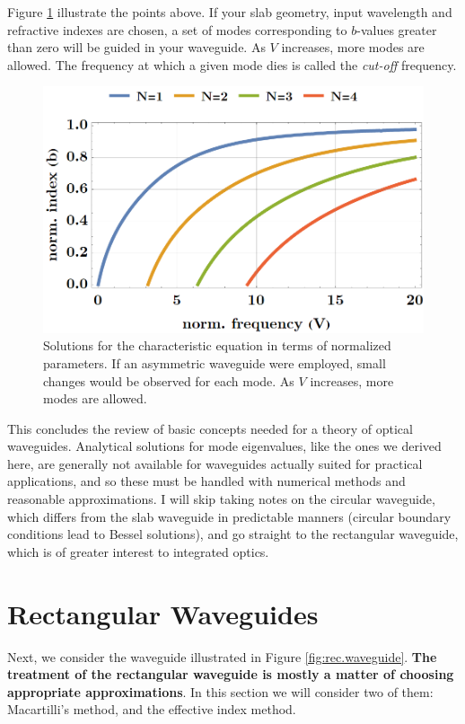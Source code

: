 Figure \ref{fig:characteric.equation} illustrate the points above. If your slab geometry, input wavelength and refractive indexes are chosen, a set of modes corresponding to $b$-values greater than zero will be guided in your waveguide. As $V$ increases, more modes are allowed. The frequency at which a given mode dies is called the \textit{cut-off} frequency.

\begin{figure}[h]
    \centering
    \includegraphics[width=0.8\linewidth]{Figuras/characteristic equation.png}
    \caption{Solutions for the characteristic equation in terms of normalized parameters. If an asymmetric waveguide were employed, small changes would be observed for each mode. As $V$ increases, more modes are allowed.}
    \label{fig:characteric.equation}
\end{figure}

\hrulefill

This concludes the review of basic concepts needed for a theory of optical waveguides. Analytical solutions for mode eigenvalues, like the ones we derived here, are generally not available for waveguides actually suited for practical applications, and so these must be handled with numerical methods and reasonable approximations. I will skip taking notes on the circular waveguide, which differs from the slab waveguide in predictable manners (circular boundary conditions lead to Bessel solutions), and go straight to the rectangular waveguide, which is of greater interest to integrated optics.

\hrulefill
\newpage
\section{Rectangular Waveguides}

Next, we consider the waveguide illustrated in Figure \ref{fig:rec.waveguide}. \textbf{The treatment of the rectangular waveguide is mostly a matter of choosing appropriate approximations}.  In this section we will consider two of them: Macartilli's method, and the effective index method.

